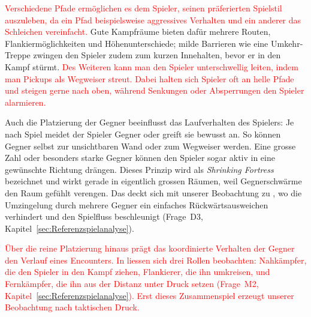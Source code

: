 \documentclass[../Main.tex]{subfiles}
\begin{document}
\textcolor{red}{Verschiedene Pfade ermöglichen es dem Spieler, seinen präferierten Spielstil auszuleben, da ein Pfad beispielsweise aggressives Verhalten und ein anderer das Schleichen vereinfacht.\autocite{gdc_tenprinciples2010}} Gute Kampfräume bieten dafür mehrere Routen, Flankiermöglichkeiten und Höhenunterschiede; milde Barrieren wie eine Umkehr-Treppe zwingen den Spieler zudem zum kurzen Innehalten, bevor er in den Kampf stürmt.\autocite{gdc_horizonquests2018} \textcolor{red}{Des Weiteren kann man den Spieler unterschwellig leiten, indem man Pickups als Wegweiser streut. Dabei halten sich Spieler oft an helle Pfade und steigen gerne nach oben, während Senkungen oder Absperrungen den Spieler alarmieren.\autocite[240, 245, 251]{rogers2014levelup}}

Auch die Platzierung der Gegner beeinflusst das Laufverhalten des Spielers: Je nach Spiel meidet der Spieler Gegner oder greift sie bewusst an. So können Gegner selbst zur unsichtbaren Wand oder zum Wegweiser werden.\autocite[199]{totten2014architectural} Eine grosse Zahl oder besonders starke Gegner können den Spieler sogar aktiv in eine gewünschte Richtung drängen. Dieses Prinzip wird als \textit{Shrinking Fortress} bezeichnet und wirkt gerade in eigentlich grossen Räumen, weil Gegnerschwärme den Raum gefühlt verengen.\autocite[199--200]{totten2014architectural} Das deckt sich mit unserer Beobachtung zu , wo die Umzingelung durch mehrere Gegner ein einfaches Rückwärtsausweichen verhindert und den Spielfluss beschleunigt (Frage~D3, Kapitel~\ref{sec:Referenzspielanalyse}).

\textcolor{red}{Über die reine Platzierung hinaus prägt das koordinierte Verhalten der Gegner den Verlauf eines Encounters. In  liessen sich drei Rollen beobachten: Nahkämpfer, die den Spieler in den Kampf ziehen, Flankierer, die ihn umkreisen, und Fernkämpfer, die ihn aus der Distanz unter Druck setzen (Frage~M2, Kapitel~\ref{sec:Referenzspielanalyse}). Erst dieses Zusammenspiel erzeugt unserer Beobachtung nach taktischen Druck.}
\end{document}
